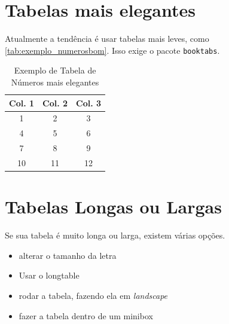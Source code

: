 \documentclass[dsc,setavermelha,numeracaoporcapitulo,linhanafolhaderosto]{ufrj}
\theoremstyle{plain}
\theoremstyle{definition}
\theoremstyle{remark}
\begin{document}
\begin{mapa}[ht]
\centering
\caption{Segundo mapa, para provar o contador e a lista}
\label{mapa:segundo}
\end{mapa}

\section{Tabelas mais elegantes}

Atualmente a tendência é usar tabelas mais leves, como \autoref{tab:exemplo_numerosbom}. Isso exige o pacote \verb*|booktabs|.

\begin{table}[ht]
\centering %
\caption{Exemplo de Tabela de Números mais elegantes}
\label{tab:exemplo_numerosbom}
\begin{tabular}{ccc} %
\toprule %
\textbf{Col. 1} & \textbf{Col. 2} & \textbf{Col. 3} \\ %
\midrule %
1 & 2 & 3 \\ %
4 & 5 & 6 \\ %
7 & 8 & 9 \\ %
10 & 11 & 12 \\ %
\bottomrule %
\end{tabular}
\end{table}

\section{Tabelas Longas ou Largas}

Se sua tabela é muito longa ou larga, existem várias opções.
\begin{itemize}
    \item alterar o tamanho da letra
    \item Usar o longtable
    \item rodar a tabela, fazendo ela em \textit{landscape}
    \item fazer a tabela dentro de um minibox
\end{itemize}
\end{document}
